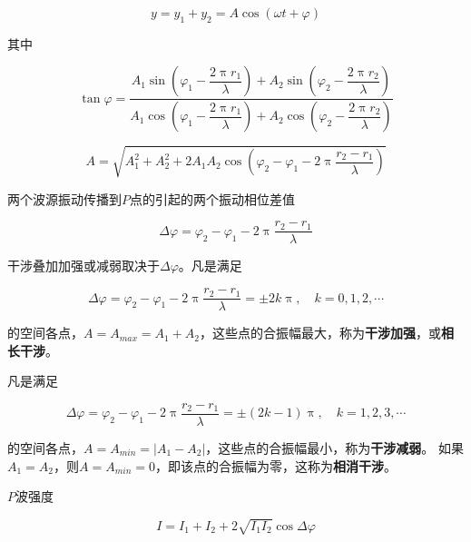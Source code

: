 \documentclass[
	12pt, %
	a4paper, %
]{myLegrandOrangeBook}
\begin{document}
    \begin{equation}
        y=y_1+y_2=A \cos (\omega t+\varphi)
    \end{equation}

    其中

    \begin{equation}
        \tan \varphi=\dfrac{A_1 \sin \left(\varphi_1-\dfrac{2 \uppi r_1}{\lambda}\right)+
        A_2 \sin \left(\varphi_2-\dfrac{2 \uppi r_2}{\lambda}\right)}{A_1 \cos \left(\varphi_1-\dfrac{2 \uppi r_1}{\lambda}\right)+A_2 \cos \left(\varphi_2-\dfrac{2 \uppi r_2}{\lambda}\right)}
    \end{equation}

    \begin{equation}
        A=\sqrt{A_1^2+A_2^2+2 A_1 A_2 \cos \left(\varphi_2-\varphi_1-2 \uppi \frac{r_2-r_1}{\lambda}\right)}
    \end{equation}

    两个波源振动传播到\(P\)点的引起的两个振动相位差值

    \begin{equation}
        \Delta \varphi=\varphi_2-\varphi_1-2 \uppi \frac{r_2-r_1}{\lambda}
    \end{equation}

    干涉叠加加强或减弱取决于\(\Delta \varphi\)。凡是满足

    \begin{equation}
        \Delta \varphi=\varphi_2-\varphi_1-2 \uppi \frac{r_2-r_1}{\lambda}= \pm 2 k \uppi, \quad k=0,1,2, \cdots
    \end{equation}

    的空间各点，\(A = A_{max} = A_1+A_2\)，这些点的合振幅最大，称为\textbf{干涉加强}，或\textbf{相长干涉}。

    凡是满足

    \begin{equation}
        \Delta \varphi=\varphi_2-\varphi_1-2 \uppi \frac{r_2-r_1}{\lambda}= \pm(2 k-1) \uppi, \quad k=1,2,3, \cdots
    \end{equation}

    的空间各点，\(A = A_{min} = \left|A_1-A_2\right|\)，这些点的合振幅最小，称为\textbf{干涉减弱}。
    如果\(A_1=A_2\)，则\(A = A_{min} = 0\)，即该点的合振幅为零，这称为\textbf{相消干涉}。

    \(P\)波强度

    \begin{equation}
        I=I_1+I_2+2 \sqrt{I_1 I_2} \cos \Delta \varphi
        \label{7-5-7}
    \end{equation}
\end{document}
